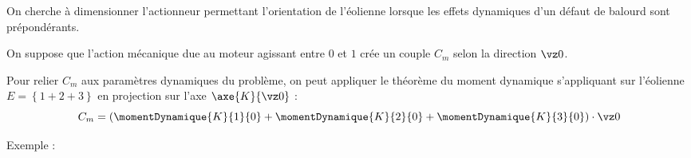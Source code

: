 \documentclass[11pt]{article}
\begin{document}
\begin{minipage}{0.5\textwidth}

On cherche à dimensionner l'actionneur permettant l'orientation de l'éolienne lorsque les effets dynamiques d'un défaut de balourd sont prépondérants.

On suppose que l'action mécanique due au moteur agissant entre $0$ et $1$ crée un couple $C_m$ selon la direction $\vz0$. 

Pour relier $C_m$ aux paramètres dynamiques du problème, on peut appliquer le théorème du moment dynamique s'appliquant sur l'éolienne $E=\left\{1+2+3\right\}$ en projection sur l'axe $\axe{K}{\vz0}$  : 
\[C_m=\left(\momentDynamique{K}{1}{0}+\momentDynamique{K}{2}{0}+\momentDynamique{K}{3}{0}\right)\cdot \vz0\]
\end{minipage}\hfill
\begin{minipage}{0.45\textwidth}
\begin{center}
\end{center}
\end{minipage}

\vspace{1em}
\begin{bclogo}[logo=\bcbook,couleur=DarkOrange!5,arrondi=0.1,sousTitre=Calcul de $\momentDynamique{K}{1}{0}\cdot\vz0$]{Exemple :}
{\vspace{11em}}
\end{bclogo}
\end{document}
